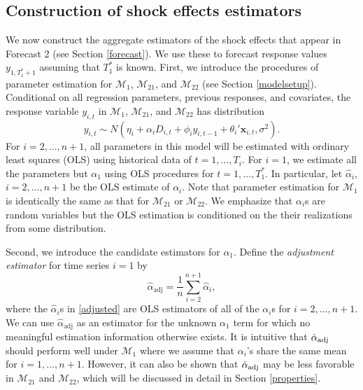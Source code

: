 \documentclass[11pt]{article}
\newcommand{\x}{\textbf{x}}
\def\mc#1{\mathcal{#1}} %
\def\E#1{\mathrm{E}(#1)} %
\theoremstyle{definition}
\begin{document}
\subsection{Construction of shock effects estimators}
\label{constructionofestimators}

We now construct the aggregate estimators of the shock effects that appear in 
Forecast 2 (see Section \ref{forecast}). We use these to forecast response values $y_{1, T_1^*+1}$ assuming that $T_1^*$ is known.  %
First, we introduce the procedures of parameter estimation for 
$\mc{M}_1$, $\mc{M}_{21}$, and $\mc{M}_{22}$ (see Section \ref{modelsetup}). 
Conditional on all regression parameters, previous responses, and covariates, 
the response variable $y_{i,t}$ in $\mc{M}_1$, $\mc{M}_{21}$, and $\mc{M}_{22}$ 
has distribution 
$$
  y_{i,t} 
    \sim N(\eta_i + \alpha_iD_{i,t} + \phi_i y_{i,t-1} + \theta_i'\x_{i,t} 
      , \sigma^2).
$$
For $i = 2, \ldots, n+1$, all parameters in this model will be estimated with ordinary least squares 
(OLS) using historical data of $t = 1, \ldots, T_i$. For $i = 1$, we estimate all the parameters but $\alpha_1$ using OLS procedures for $t=1, \ldots, T_1^*$. In particular, let $\hat{\alpha}_i$, $i = 2, \ldots, n+1$ be the OLS estimate 
of $\alpha_i$.  Note that parameter estimation 
for $\mc{M}_1$ is identically the same as that for $\mc{M}_{21}$ or $\mc{M}_{22}$.  We emphasize that $\alpha_i$s are random variables but the OLS estimation is conditioned on the their realizations from some distribution.


Second, we introduce the candidate estimators for $\alpha_1$. Define the 
\emph{adjustment estimator} for time series $i=1$ by
\begin{equation} \label{adjusted}
  \hat{\alpha}_{\text{adj}} = \frac{1}{n}\sum_{i=2}^{n+1}\hat{\alpha}_i,
\end{equation}
where the $\hat{\alpha}_i$s in \eqref{adjusted} are OLS estimators of all of 
the $\alpha_i$s for $i = 2, \ldots, n+1$.  We can use $\hat{\alpha}_{\text{adj}}$ as an estimator for 
the unknown $\alpha_1$ term for which no meaningful estimation information 
otherwise exists. It is intuitive that $\hat{\alpha}_{\rm adj}$ should perform 
well under $\mc{M}_1$ where we assume that $\alpha_i$'s share the same mean 
for $i= 1, \ldots, n+1$. However, it can also be shown that 
$\hat{\alpha}_{\rm adj}$ may be less favorable in $\mc{M}_{21}$ 
and $\mc{M}_{22}$, which will be discussed in detail in Section \ref{properties}. 
\end{document}
